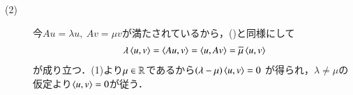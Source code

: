 \begin{prf}
\begin{description}
			\item[(2)]
				今$Au = \lambda u,\ Av = \mu v$が満たされているから，()と同様にして
				\begin{align}
					\lambda \inprod<u,v> = \inprod<Au,v> = \inprod<u,Av> = \conj{\mu} \inprod<u,v>
				\end{align}
				が成り立つ．(1)より$\mu \in \mathbb{R}$であるから$(\lambda - \mu) \inprod<u,v> = 0$
				が得られ，$\lambda \neq \mu$の仮定より$\inprod<u,v> = 0$が従う．
				\QED
		\end{description}
	\end{prf}
	
	